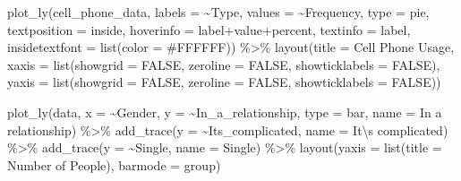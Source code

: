 \documentclass[
]{book}
\newenvironment{Shaded}{\begin{snugshade}}{\end{snugshade}}
\newcommand{\AttributeTok}[1]{\textcolor[rgb]{0.77,0.63,0.00}{#1}}
\newcommand{\ConstantTok}[1]{\textcolor[rgb]{0.00,0.00,0.00}{#1}}
\newcommand{\FunctionTok}[1]{\textcolor[rgb]{0.00,0.00,0.00}{#1}}
\newcommand{\NormalTok}[1]{#1}
\newcommand{\SpecialCharTok}[1]{\textcolor[rgb]{0.00,0.00,0.00}{#1}}
\newcommand{\StringTok}[1]{\textcolor[rgb]{0.31,0.60,0.02}{#1}}
\begin{document}
\begin{Shaded}
\begin{Highlighting}[]
\FunctionTok{plot\_ly}\NormalTok{(cell\_phone\_data, }\AttributeTok{labels =} \SpecialCharTok{\textasciitilde{}}\NormalTok{Type, }\AttributeTok{values =} \SpecialCharTok{\textasciitilde{}}\NormalTok{Frequency, }\AttributeTok{type =} \StringTok{\textquotesingle{}pie\textquotesingle{}}\NormalTok{,}
        \AttributeTok{textposition =} \StringTok{\textquotesingle{}inside\textquotesingle{}}\NormalTok{, }\AttributeTok{hoverinfo =} \StringTok{\textquotesingle{}label+value+percent\textquotesingle{}}\NormalTok{,}
        \AttributeTok{textinfo =} \StringTok{\textquotesingle{}label\textquotesingle{}}\NormalTok{, }\AttributeTok{insidetextfont =} \FunctionTok{list}\NormalTok{(}\AttributeTok{color =} \StringTok{\textquotesingle{}\#FFFFFF\textquotesingle{}}\NormalTok{)) }\SpecialCharTok{\%\textgreater{}\%}
  \FunctionTok{layout}\NormalTok{(}\AttributeTok{title =} \StringTok{\textquotesingle{}Cell Phone Usage\textquotesingle{}}\NormalTok{,}
         \AttributeTok{xaxis =} \FunctionTok{list}\NormalTok{(}\AttributeTok{showgrid =} \ConstantTok{FALSE}\NormalTok{, }\AttributeTok{zeroline =} \ConstantTok{FALSE}\NormalTok{, }\AttributeTok{showticklabels =} \ConstantTok{FALSE}\NormalTok{),}
         \AttributeTok{yaxis =} \FunctionTok{list}\NormalTok{(}\AttributeTok{showgrid =} \ConstantTok{FALSE}\NormalTok{, }\AttributeTok{zeroline =} \ConstantTok{FALSE}\NormalTok{, }\AttributeTok{showticklabels =} \ConstantTok{FALSE}\NormalTok{))}
\end{Highlighting}
\end{Shaded}

\begin{Shaded}
\begin{Highlighting}[]
\FunctionTok{plot\_ly}\NormalTok{(data, }\AttributeTok{x =} \SpecialCharTok{\textasciitilde{}}\NormalTok{Gender, }\AttributeTok{y =} \SpecialCharTok{\textasciitilde{}}\NormalTok{In\_a\_relationship, }\AttributeTok{type =} \StringTok{\textquotesingle{}bar\textquotesingle{}}\NormalTok{, }\AttributeTok{name =} \StringTok{\textquotesingle{}In a relationship\textquotesingle{}}\NormalTok{) }\SpecialCharTok{\%\textgreater{}\%}
  \FunctionTok{add\_trace}\NormalTok{(}\AttributeTok{y =} \SpecialCharTok{\textasciitilde{}}\NormalTok{Its\_complicated, }\AttributeTok{name =} \StringTok{\textquotesingle{}It}\SpecialCharTok{\textbackslash{}\textquotesingle{}}\StringTok{s complicated\textquotesingle{}}\NormalTok{) }\SpecialCharTok{\%\textgreater{}\%}
  \FunctionTok{add\_trace}\NormalTok{(}\AttributeTok{y =} \SpecialCharTok{\textasciitilde{}}\NormalTok{Single, }\AttributeTok{name =} \StringTok{\textquotesingle{}Single\textquotesingle{}}\NormalTok{) }\SpecialCharTok{\%\textgreater{}\%}
  \FunctionTok{layout}\NormalTok{(}\AttributeTok{yaxis =} \FunctionTok{list}\NormalTok{(}\AttributeTok{title =} \StringTok{\textquotesingle{}Number of People\textquotesingle{}}\NormalTok{), }\AttributeTok{barmode =} \StringTok{\textquotesingle{}group\textquotesingle{}}\NormalTok{)}
\end{Highlighting}
\end{Shaded}
\end{document}
